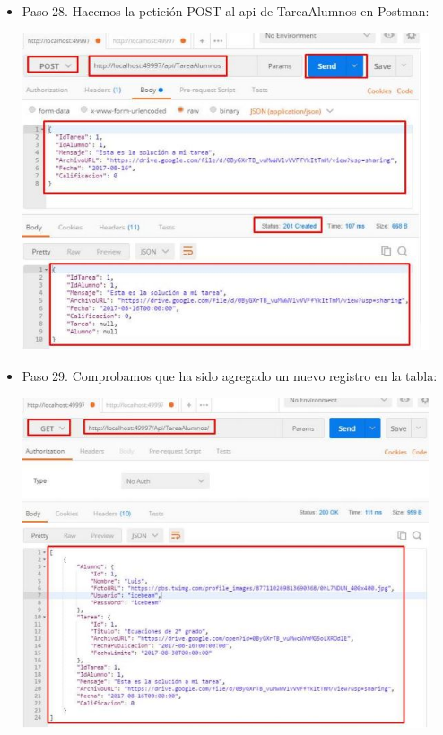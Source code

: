 \begin{flushleft}
\begin{itemize}
\item Paso 28.  Hacemos la petición POST al api de TareaAlumnos en Postman:
\begin{center}
	\includegraphics[width=12cm]{./Imagenes/paso28} 
	\end{center}

\item Paso 29.   Comprobamos que ha sido agregado un nuevo registro en la tabla:
\begin{center}
	\includegraphics[width=12cm]{./Imagenes/paso29} 
	\end{center}





\end{itemize} 


\end{flushleft}
